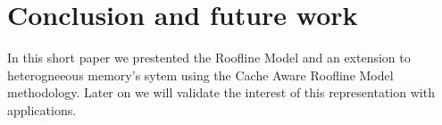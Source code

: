 \documentclass[runningheads,a4paper]{llncs}
\begin{document}





\section{Conclusion and future work}

In this short paper we prestented the Roofline Model and an extension to heterogneeous memory's sytem using the Cache Aware
Roofline Model methodology. Later on we will validate the interest of this representation with applications. 




\end{document}
